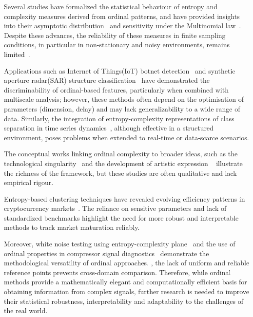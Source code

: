Several studies have formalized the statistical behaviour of entropy and complexity measures derived from ordinal patterns, and have provided insights into their asymptotic distribution~\cite{Rey2024, Rey2023a} and sensitivity under the Multinomial law~\cite{Rey2023}. Despite these advances, the reliability of these measures in finite sampling conditions, in particular in non-stationary and noisy environments, remains limited~\cite{Borges2023}. 


Applications such as  Internet of Things(IoT) botnet detection~\cite{Borges2023} and  synthetic aperture radar(SAR) structure classification~\cite{Chagas2021a} have demonstrated the discriminability of ordinal-based features, particularly when combined with multiscale analysis; however, these methods often depend on the optimisation of parameters (dimension, delay) and may lack generalizability to a wide range of data. Similarly, the integration of entropy-complexity representations of class separation in time series dynamics~\cite{Borges2022}, although effective in a structured environment, poses problems when extended to real-time or data-scarce scenarios. 

The conceptual works linking ordinal complexity to broader ideas, such as the technological singularity~\cite{Modis2022} and the development of artistic expression ~\cite{Sigaki2018} illustrate the richness of the framework, but these studies are often qualitative and lack empirical rigour. 

Entropy-based clustering techniques have revealed evolving efficiency patterns in cryptocurrency markets~\cite{Sigaki2019}. The reliance on sensitive parameters and lack of standardized benchmarks highlight the need for more robust and interpretable methods to track market maturation reliably.

Moreover, white noise testing using entropy-complexity plane~\cite{Chagas2022a} and the use of ordinal properties in compressor signal diagnostics~\cite{Barbosa2024} demonstrate the methodological versatility of ordinal approaches. , the lack of uniform and reliable reference points prevents cross-domain comparison. Therefore, while ordinal methods provide a mathematically elegant and computationally efficient basis for obtaining information from complex signals, further research is needed to improve their statistical robustness, interpretability and adaptability to the challenges of the real world.

